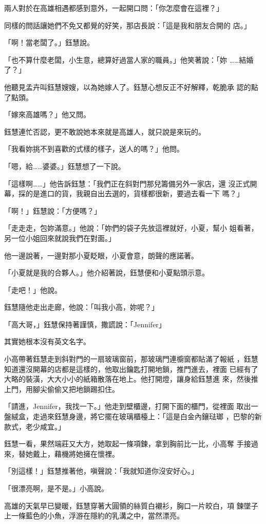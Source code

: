 兩人對於在高雄相遇都感到意外，一起開口問：「你怎麼會在這裡？」

同樣的問話讓她們不免又都覺的好笑，那店長說：「這是我和朋友合開的
店。」

「啊！當老闆了。」鈺慧說。

「也不算什麼老闆，小生意，總算好過當人家的職員。」他笑著說：「妳
……結婚了？」

他聽見孟卉叫鈺慧嫂嫂，以為她嫁人了。鈺慧心想反正不好解釋，乾脆承
認的點了點頭。

「嫁來高雄嗎？」他又問。

鈺慧連忙否認，更不敢說她本來就是高雄人，就只說是來玩的。

「我看妳挑不到喜歡的式樣的樣子，送人的嗎？」他問。

「嗯，給……婆婆。」鈺慧想了一下說。

「這樣啊……」他告訴鈺慧：「我們正在斜對門那兒籌備另外一家店，還
沒正式開幕，採的是進口的貨，我親自出去選的，貨樣都很新，要過去看一下
嗎？」

「啊！」鈺慧說：「方便嗎？」

「走走走，包妳滿意。」他說：「妳們的袋子先放這裡就好，小夏，幫小
姐看著，另一位小姐回來就說我們在對面。」

他一邊說著，一邊對那小夏眨眼，小夏會意，朗聲的應諾著。

「小夏就是我的合夥人。」他介紹著說，鈺慧便和小夏點頭示意。

「走吧！」他說。

鈺慧隨他走出走廊，他說：「叫我小高，妳呢？」

「高大哥，」鈺慧保持著謹慎，撒謊說：「Jennifer」

其實她根本沒有英文名字。

小高帶著鈺慧走到斜對門的一扇玻璃窗前，那玻璃門連櫥窗都貼滿了報紙
，鈺慧知道還沒開幕的店都是這樣的，他取出鑰匙打開地鎖，推門進去，裡面
已經有了大略的裝潢，大大小小的紙箱散落在地上。他打開燈，讓身給鈺慧進
來，然後推上門，用腳尖偷偷又把地鎖踢扣住。

「請進，Jennifer，我找一下。」他走到壁櫃邊，打開下面的櫃門，從裡面
取出一盤絨盒，走過來鈺慧身邊，將它擺在玻璃櫃檯上：「這是白金內鑲琺瑯
，巴黎的新款式，老少咸宜。」

鈺慧一看，果然端莊又大方，她取起一條項鍊，拿到胸前比一比，小高奪
手接過來，替她戴上，藉機將她擁在懷裡。

「別這樣！」鈺慧推著他，嗔聲說：「我就知道你沒安好心。」

「很漂亮啊，是不是。」小高說。

高雄的天氣早已變暖，鈺慧穿著大圓領的絲質白襯衫，胸口一片皎白，項
鍊墜子上一條藍色的小魚，浮游在隱約的乳溝之中，當然漂亮。

